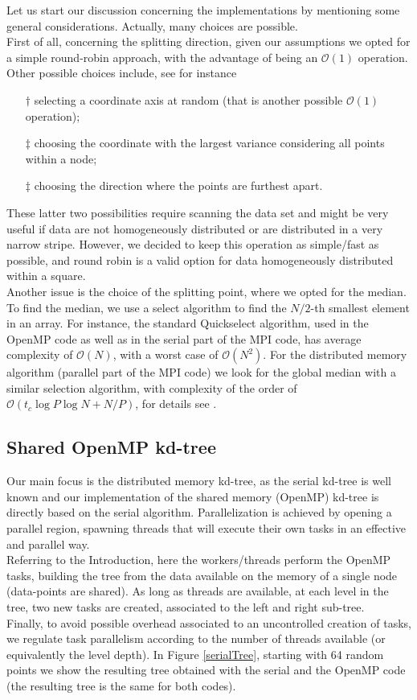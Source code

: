 \documentclass[amssymb, aps,nofootinbib, superscriptaddress, notitlepage]{revtex4}
\begin{document}
Let us start our discussion concerning the implementations by mentioning some general considerations.
Actually, many choices are possible. 
\\
First of all, concerning the splitting direction, given our assumptions we opted for a simple round-robin approach, with the advantage of being an $\mathcal{O}(1)$ operation.
\\
Other possible choices include, see for instance \cite{xiao2016parallel}
\begin{itemize}
\item[$\dagger$] selecting a coordinate axis at random (that is another possible $\mathcal{O}(1)$ operation);
\item[$\ddagger$] choosing the coordinate with the largest variance considering all points within a node;
\item[$\ddagger$] choosing the direction where the points are furthest apart.
\end{itemize}
These latter two possibilities require scanning the data set and might be very useful if data are not homogeneously distributed or are distributed in a very narrow stripe.
 However, we decided to keep this operation as simple/fast as possible, and round robin is a valid option for data homogeneously distributed within a square.
\\
Another issue is the choice of the splitting point, where we opted for the median. To find the median, we use a select algorithm to find the $N/2$-th smallest element in an array.
For instance, the standard Quickselect algorithm, used in the OpenMP code as well as in the serial part of the MPI code,  has  average complexity of $\mathcal{O}(N)$, with a worst case of $\mathcal{O}(N^2)$.
For the distributed memory algorithm (parallel part of the MPI code) we  look for the global median with a similar selection algorithm, with complexity of the order of $\mathcal{O}(t_c \log P \log N + N/P)$, for details see  \cite{xiao2016parallel}.

\subsection{Shared OpenMP kd-tree}
Our main focus is the distributed memory kd-tree, as the serial kd-tree is well known and our implementation of the shared memory (OpenMP) kd-tree is directly based on the serial algorithm.
Parallelization is achieved by opening a parallel region, spawning threads that will execute their own tasks  in an effective and parallel way.
\\
Referring to the Introduction, here  the workers/threads perform the OpenMP tasks, building the tree from the data available on the memory of a single node (data-points are shared).  As long as threads are available, at each level in the tree, two new tasks are created, associated to the left and right sub-tree. 
\\
Finally, to avoid possible overhead associated to an uncontrolled creation of tasks, we regulate task parallelism according to the number of threads available (or equivalently the level depth).
In Figure \ref{serialTree}, starting with 64 random points we show the resulting tree obtained with the serial and the OpenMP code (the resulting tree is the same for both codes). 
\end{document}
